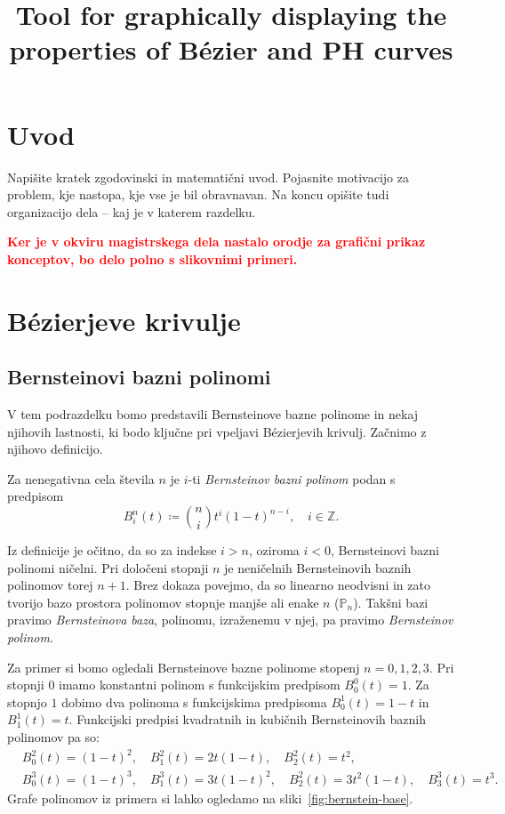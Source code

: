 \documentclass[isrm2, tisk]{fmfdelo}
\title{Tool for graphically displaying the properties of Bézier and PH curves}
\newcommand{\Z}{\mathbb Z}
\newcommand{\bernstein}[2]{\binom{#1}{#2}t^{#2}(1-t)^{#1-#2}}
\newcommand{\mycomment}[1]{\textbf{\textcolor{red}{#1}}}
\begin{document}
    \section{Uvod}
    Napišite kratek zgodovinski in matematični uvod. Pojasnite motivacijo za problem, kje
    nastopa, kje vse je bil obravnavan. Na koncu opišite tudi organizacijo dela -- kaj je v
    katerem razdelku.


    \mycomment{Ker je v okviru magistrskega dela nastalo orodje za grafični prikaz konceptov, bo delo polno s slikovnimi primeri.}


    \section{Bézierjeve krivulje}\label{sec:bezierjeve-krivulje}

    \subsection{Bernsteinovi bazni polinomi}\label{subsec:bernsteinovi-polinomi}
    V tem podrazdelku bomo predstavili Bernsteinove bazne polinome in nekaj njihovih lastnosti, ki bodo ključne pri vpeljavi Bézierjevih krivulj.
    Začnimo z njihovo definicijo.
    \begin{definicija}
        \label{def:bernstein}
        Za nenegativna cela števila $n$ je $i$-ti \textit{Bernsteinov bazni polinom} podan s predpisom \[B_i^n(t)\coloneqq\bernstein{n}{i},\quad i\in\Z.\]
    \end{definicija}
    \noindent Iz definicije je očitno, da so za indekse $i>n$, oziroma $i<0$, Bernsteinovi bazni polinomi ničelni.
    Pri določeni stopnji $n$ je neničelnih Bernsteinovih baznih polinomov torej $n+1$.
    Brez dokaza povejmo, da so linearno neodvisni in zato tvorijo bazo prostora polinomov stopnje manjše ali enake $n$ ($\mathbb{P}_n$).
    Takšni bazi pravimo \textit{Bernsteinova baza}, polinomu, izraženemu v njej, pa pravimo \textit{Bernsteinov polinom}.
    \begin{primer}
        \label{primer:bernsteinovi}
        Za primer si bomo ogledali Bernsteinove bazne polinome stopenj $n=0,1,2,3$.
        Pri stopnji $0$ imamo konstantni polinom s funkcijskim predpisom $B_{0}^{0}(t) = 1$.
        Za stopnjo $1$ dobimo dva polinoma s funkcijskima predpisoma $B_{0}^{1}(t) = 1-t$ in $B_{1}^{1}(t) = t$.
        Funkcijski predpisi kvadratnih in kubičnih Bernsteinovih baznih polinomov pa so:
        \begin{align*}
            &B_{0}^{2}(t) = (1-t)^2,\quad B_{1}^{2}(t) = 2t(1-t),\quad B_{2}^{2}(t) = t^2,  \\
            &B_{0}^{3}(t) = (1-t)^3,\quad B_{1}^{3}(t) = 3t(1-t)^2,\quad B_{2}^{2}(t) = 3t^2(1-t),\quad B_{3}^{3}(t) = t^3.
        \end{align*}
        Grafe polinomov iz primera si lahko ogledamo na sliki~\ref{fig:bernstein-base}.
    \end{primer}
\end{document}
